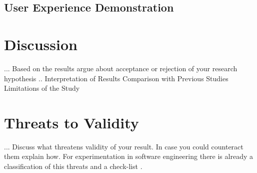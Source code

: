 \subsection{User Experience Demonstration}

\section{Discussion}


... Based on the results argue about acceptance or rejection of your research hypothesis   .. 
Interpretation of Results
Comparison with Previous Studies
Limitations of the Study


\section{Threats to Validity}

... Discuss what threatens validity of your result. In case you could counteract them explain how. For experimentation in software engineering there is already a classification of this threats and a check-list \cite{DBLP:journals/ese/RunesonH09}.   

